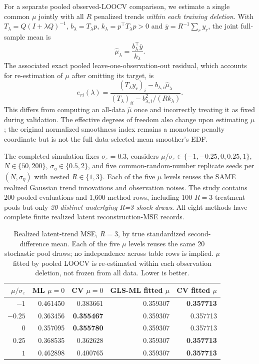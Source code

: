 \documentclass[11pt]{article}
\begin{document}
For a separate pooled observed-LOOCV comparison,
we estimate a single common $\mu$ jointly with all $R$
penalized trends \emph{within each training deletion}.
With $T_\lambda=Q(I+\lambda Q)^{-1}$,
$b_\lambda=T_\lambda p$,
$k_\lambda=p^\top T_\lambda p>0$ and
$\overline y=R^{-1}\sum_r y_r$, the joint full-sample
mean is
\[
 \widehat\mu_\lambda=
 \frac{b_\lambda^\top\overline y}{k_\lambda}.
\]
The associated exact pooled leave-one-observation-out
residual, which accounts for re-estimation of $\mu$
after omitting its target, is
\begin{equation}\label{eq:nonzero-mu-fold-clean-press}
 e_{ri}(\lambda)=
 \frac{(T_\lambda y_r)_i-
       b_{\lambda,i}\widehat\mu_\lambda}
 {(T_\lambda)_{ii}-
       b_{\lambda,i}^2/(R k_\lambda)}.
\end{equation}
This differs from computing an all-data $\widehat\mu$ once
and incorrectly treating it as fixed during validation.
The effective degrees of freedom also change upon
estimating $\mu$; the original normalized smoothness
index remains a monotone penalty coordinate but is
not the full data-selected-mean smoother's EDF.

The completed simulation fixes
$\sigma_\varepsilon=0.3$, considers
$\mu/\sigma_\varepsilon\in\{-1,-0.25,0,0.25,1\}$,
$N\in\{50,200\}$, $\sigma_\eta\in\{0.5,2\}$,
and five common-random-number replicate seeds per
$(N,\sigma_\eta)$ with nested $R\in\{1,3\}$.
Each of the five $\mu$ levels reuses the SAME
realized Gaussian trend innovations and observation noises.
The study contains 200 pooled evaluations and 1,600
method rows, including 100 $R=3$ treatment pools but
only \emph{20 distinct underlying R=3 shock draws}.
All eight methods have complete finite realized latent
reconstruction-MSE records.

\begin{table}[ht]
\centering
\caption{Realized latent-trend MSE, $R=3$, by true
standardized second-difference mean. Each of the
five $\mu$ levels reuses the same 20 stochastic pool
draws; no independence across table rows is implied.
$\mu$ fitted by pooled LOOCV is re-estimated within
each observation deletion, not frozen from all data.
Lower is better.}
\label{tab:mu-nonzero-results}
\begin{tabular}{rrrrr}
\toprule
$\mu/\sigma_\varepsilon$ &
ML $\mu=0$ & CV $\mu=0$ &
GLS-ML fitted $\mu$ & CV fitted $\mu$\\
\midrule
$-1$    & 0.461450 & 0.383661 & 0.359307 & \textbf{0.357713}\\
$-0.25$ & 0.363456 & \textbf{0.355467} & 0.359307 & 0.357713\\
$0$     & 0.357095 & \textbf{0.355780} & 0.359307 & 0.357713\\
$0.25$  & 0.368535 & 0.362628 & 0.359307 & \textbf{0.357713}\\
$1$     & 0.462898 & 0.400765 & 0.359307 & \textbf{0.357713}\\
\bottomrule
\end{tabular}
\end{table}
\end{document}
